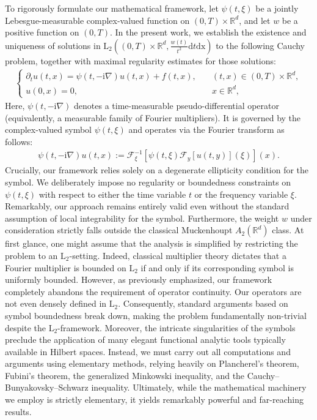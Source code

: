 \documentclass[11pt,reqno]{amsart}
\theoremstyle{definition}
\theoremstyle{remark}
\newcommand\bR{\mathbb{R}}
\newcommand\cF{\mathcal{F}}
\numberwithin{equation}{section}
\begin{document}
To rigorously formulate our mathematical framework, let $\psi(t,\xi)$ be a  jointly Lebesgue-measurable complex-valued function on $(0,T) \times \mathbb{R}^d$, and let $w$ be a positive function on $(0,T)$.
In the present work, we establish the existence and uniqueness of solutions in $\mathrm{L}_2\left((0,T) \times \mathbb{R}^d, \frac{w(t)}{t^2}\mathrm{d}t \mathrm{dx}\right)$ to the following Cauchy problem, together with maximal regularity estimates for those solutions:
\begin{align}
								\label{ab eqn}
\begin{cases}
\partial_tu(t,x)=\psi(t,-\mathrm{i}\nabla)u(t,x)+f(t,x),\quad &(t,x)\in(0,T)\times\mathbb{R}^d,\\
u(0,x)=0,\quad & x\in\mathbb{R}^d,
\end{cases}
\end{align}
Here, $\psi(t,-\mathrm{i}\nabla)$ denotes a time-measurable pseudo-differential operator (equivalently, a measurable family of Fourier multipliers). It is governed by the complex-valued symbol $\psi(t,\xi)$ and operates via the Fourier transform as follows:
\begin{align}
								\label{ab op}
\psi(t,-\mathrm{i}\nabla)u(t,x):=\cF_\xi^{-1}\left[\psi(t,\xi)\cF_y[u(t,y)](\xi)\right](x).
\end{align}
Crucially, our framework relies solely on a degenerate ellipticity condition for the symbol. 
We deliberately impose no regularity or boundedness constraints on $\psi(t,\xi)$ with respect to either the time variable $t$ or the frequency variable $\xi$. 
Remarkably, our approach remains entirely valid even without the standard assumption of local integrability for the symbol. 
Furthermore, the weight $w$ under consideration strictly falls outside the classical Muckenhoupt $A_2(\bR^d)$ class.
At first glance, one might assume that the analysis is simplified by restricting the problem to an $\mathrm{L}_2$-setting. 
Indeed, classical multiplier theory dictates that a Fourier multiplier is bounded on $\mathrm{L}_2$ if and only if its corresponding symbol is uniformly bounded. 
However, as previously emphasized, our framework completely abandons the requirement of operator continuity. Our operators are not even densely defined in $\mathrm{L}_2$.
Consequently, standard arguments based on symbol boundedness break down, making the problem fundamentally non-trivial despite the $\mathrm{L}_2$-framework.
Moreover, the intricate singularities of the symbols preclude the application of many elegant functional analytic tools typically available in Hilbert spaces. 
Instead, we must carry out all computations and arguments using elementary methods, relying heavily on Plancherel's theorem, Fubini's theorem, the generalized Minkowski inequality, and the Cauchy--Bunyakovsky--Schwarz inequality. 
Ultimately, while the mathematical machinery we employ is strictly elementary, it yields remarkably powerful and far-reaching results.
\end{document}
